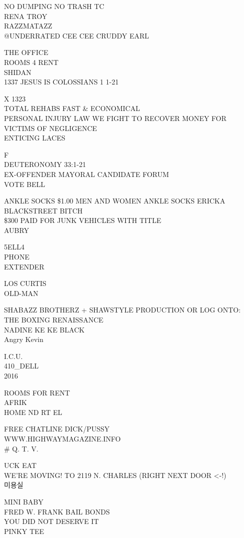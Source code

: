 \documentclass[10pt,letterpaper]{article}
\begin{document}
NO DUMPING NO TRASH TC\\
RENA TROY\\
RAZZMATAZZ\\
@UNDERRATED CEE CEE CRUDDY EARL

THE OFFICE\\
ROOMS 4 RENT\\
SHIDAN\\
1337 JESUS IS COLOSSIANS 1 1{-}21

X 1323\\
TOTAL REHABS FAST \& ECONOMICAL\\
PERSONAL INJURY LAW WE FIGHT TO RECOVER MONEY FOR VICTIMS OF NEGLIGENCE\\
ENTICING LACES

F\\
DEUTERONOMY 33:1{-}21\\
EX{-}OFFENDER MAYORAL CANDIDATE FORUM\\
VOTE BELL

ANKLE SOCKS \$1.00 MEN AND WOMEN ANKLE SOCKS ERICKA\\
BLACKSTREET BITCH\\
\$300 PAID FOR JUNK VEHICLES WITH TITLE\\
AUBRY

5ELL4\\
PHONE\\
EXTENDER

LOS CURTIS\\
OLD{-}MAN

SHABAZZ BROTHERZ + SHAWSTYLE PRODUCTION OR LOG ONTO: THE BOXING RENAISSANCE\\
NADINE KE KE BLACK\\
Angry Kevin

I.C.U.\\
410\_DELL\\
2016

ROOMS FOR RENT\\
AFRIK\\
HOME ND RT EL

FREE CHATLINE DICK/PUSSY\\
WWW.HIGHWAYMAGAZINE.INFO\\
\# Q. T. V.

UCK EAT\\
WE'RE MOVING!  TO 2119 N. CHARLES (RIGHT NEXT DOOR <{-}!)\\
미용실

MINI BABY\\
FRED W. FRANK BAIL BONDS\\
YOU DID NOT DESERVE IT\\
PINKY TEE
\end{document}
